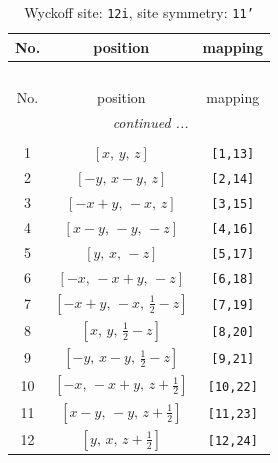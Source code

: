 \documentclass[fleqn,8pt]{jsarticle}
\begin{document}
\renewcommand{\arraystretch}{1.2}
\begin{longtable}{ccc}
\caption{Wyckoff site: {\tt 12i}, site symmetry: {\tt 11'}}
 \\
 \hline \hline
No. & position & mapping \\ \hline \endfirsthead

\multicolumn{2}{l}{\tablename\ \thetable{}} \\
 \hline \hline
No. & position & mapping \\ \hline \endhead

 \hline \hline
\multicolumn{2}{r}{\footnotesize\it continued ...} \\ \endfoot

 \hline \hline
\multicolumn{2}{r}{} \\ \endlastfoot

1 & $\left[ x,\, y,\, z \right]$ & {\tt [1,13]} \\ \hline
2 & $\left[ - y,\, x - y,\, z \right]$ & {\tt [2,14]} \\ \hline
3 & $\left[ - x + y,\, - x,\, z \right]$ & {\tt [3,15]} \\ \hline
4 & $\left[ x - y,\, - y,\, - z \right]$ & {\tt [4,16]} \\ \hline
5 & $\left[ y,\, x,\, - z \right]$ & {\tt [5,17]} \\ \hline
6 & $\left[ - x,\, - x + y,\, - z \right]$ & {\tt [6,18]} \\ \hline
7 & $\left[ - x + y,\, - x,\, \frac{1}{2} - z \right]$ & {\tt [7,19]} \\ \hline
8 & $\left[ x,\, y,\, \frac{1}{2} - z \right]$ & {\tt [8,20]} \\ \hline
9 & $\left[ - y,\, x - y,\, \frac{1}{2} - z \right]$ & {\tt [9,21]} \\ \hline
10 & $\left[ - x,\, - x + y,\, z + \frac{1}{2} \right]$ & {\tt [10,22]} \\ \hline
11 & $\left[ x - y,\, - y,\, z + \frac{1}{2} \right]$ & {\tt [11,23]} \\ \hline
12 & $\left[ y,\, x,\, z + \frac{1}{2} \right]$ & {\tt [12,24]} \\
\end{longtable}
\end{document}
